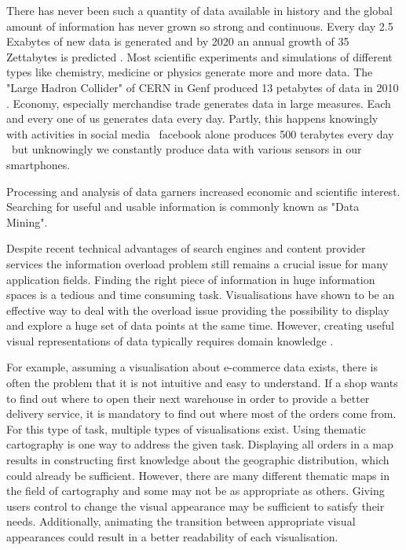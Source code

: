 There has never been such a quantity of data available in history and the global amount of information has never grown so strong and continuous. Every day 2.5 Exabytes of new data is generated and by 2020 an annual growth of 35 Zettabytes is predicted . Most scientific experiments and simulations of different types like chemistry, medicine or physics generate more and more data. The "Large Hadron Collider" of CERN in Genf produced 13 petabytes of data in 2010 . Economy, especially merchandise trade generates data in large measures. Each and every one of us generates data every day. Partly, this happens knowingly with activities in social media \textendash\ facebook alone produces 500 terabytes every day  \textendash\ but unknowingly we constantly produce data with various sensors in our smartphones.

Processing and analysis of data garners increased economic and scientific interest. Searching for useful and usable information is commonly known as "Data Mining".

Despite recent technical advantages of search engines and content provider services the information overload problem still remains a crucial issue for many application fields. Finding the right piece of information in huge information spaces is a tedious and time consuming task. Visualisations have shown to be an effective way to deal with the overload issue providing the possibility to display and explore a huge set of data points at the same time. However, creating useful visual representations of data typically requires domain knowledge .

For example, assuming a visualisation about e-commerce data exists, there is often the problem that it is not intuitive and easy to understand. If a shop wants to find out where to open their next warehouse in order to provide a better delivery service, it is mandatory to find out where most of the orders come from. For this type of task, multiple types of visualisations exist. Using thematic cartography is one way to address the given task. Displaying all orders in a map results in constructing first knowledge about the geographic distribution, which could already be sufficient. However, there are many different thematic maps in the field of cartography and some may not be as appropriate as others. Giving users control to change the visual appearance may be sufficient to satisfy their needs. Additionally, animating the transition between appropriate visual appearances could result in a better readability of each visualisation.

